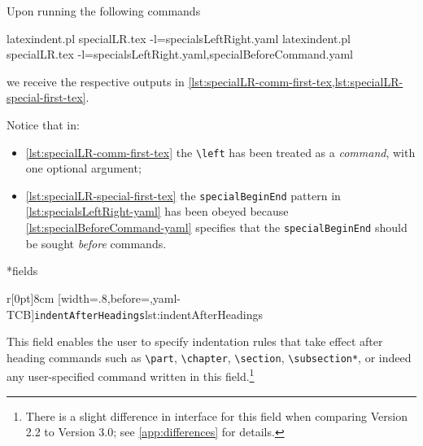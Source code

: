 	Upon running the following commands
	\begin{widepage}
		\begin{commandshell}
latexindent.pl specialLR.tex -l=specialsLeftRight.yaml      
latexindent.pl specialLR.tex -l=specialsLeftRight.yaml,specialBeforeCommand.yaml      
    \end{commandshell}
	\end{widepage}
	we receive the respective outputs in \cref{lst:specialLR-comm-first-tex,lst:specialLR-special-first-tex}.

	\begin{minipage}{.49\linewidth}
	\end{minipage}
	\hfill
	\begin{minipage}{.49\linewidth}
	\end{minipage}

	Notice that in:
	\begin{itemize}
		\item \cref{lst:specialLR-comm-first-tex} the \lstinline!\left! has been treated as a \emph{command}, with one optional argument;
		\item \cref{lst:specialLR-special-first-tex} the \texttt{specialBeginEnd} pattern in \cref{lst:specialsLeftRight-yaml} has been obeyed
		      because \cref{lst:specialBeforeCommand-yaml} specifies that the \texttt{specialBeginEnd} should be sought \emph{before} commands.
	\end{itemize}

*{fields}
	\begin{wrapfigure}[17]{r}[0pt]{8cm}
		[width=.8\linewidth,before=\centering,yaml-TCB]{\texttt{indentAfterHeadings}}{lst:indentAfterHeadings}
	\end{wrapfigure}
	This field enables the user to specify
	indentation rules that take effect after heading commands such as \lstinline!\part!, \lstinline!\chapter!,
	\lstinline!\section!, \lstinline!\subsection*!, or indeed any user-specified command written in this field.\footnote{There is a slight
		difference in interface for this field when comparing Version 2.2 to Version 3.0; see \vref{app:differences} for details.}

